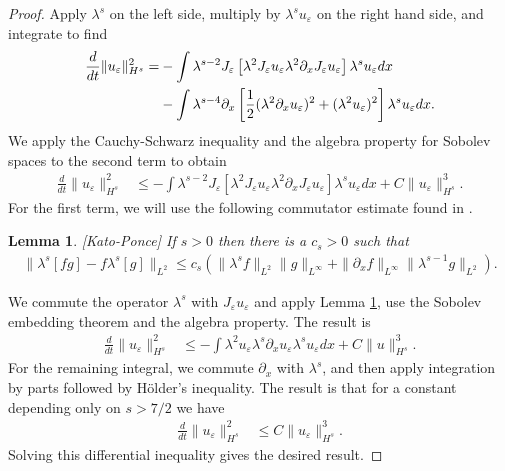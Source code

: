 \documentclass[reqno]{amsart}
\theoremstyle{plain}
\newtheorem{lemma}{Lemma}[section]
\numberwithin{equation}{section}
\newcommand{\ee}{\varepsilon}
\begin{document}
\begin{proof}
    Apply $ \lambda^{s}$ on the left side, multiply by $\lambda^{s} u_\ee$ on the right hand side, and integrate to find 
\begin{align}
   \frac{d}{dt}  \|u_\ee\|^2_{H^s}   
   =  &
  - \int \lambda^{s-2} J_\ee \left [ \lambda^2 J_\ee u_\ee \lambda^2 \partial_x J_\ee u _\ee \right]  \lambda^s u_\ee dx
\notag
\\
  &- \int \lambda^{s-4} \partial_x \left[    \frac12( \lambda^2 \partial_x u_\ee  )^2 +  
(  \lambda^2   u _\ee )^2  \right]  \lambda^s u_\ee dx .
\notag
\end{align}
  We apply the Cauchy-Schwarz inequality and the algebra property for Sobolev spaces to the second term  to obtain 
  \begin{align}
    \frac{d}{dt}  \|u_\ee\|^2_{H^s}   
  & \le
  - \int \lambda^{s-2} J_\ee \left [ \lambda^2 J_\ee u_\ee \lambda^2 \partial_x J_\ee u _\ee \right]  \lambda^s u_\ee dx
  +     C \|u_\ee\|_{H^s}^3. 
\end{align}
For the first term, we will use the following commutator estimate found in \cite{kp}.
\begin{lemma}\label{KP} [Kato-Ponce] If $s>0$ then there is a $c_s>0$ such that 
\begin{align}
\| \lambda^s [fg]- f\lambda^s[g]\|_{L^2} \le c_s \left( \|\lambda^s f\|_{L^2} \|g\|_{L^\infty}+ \|\partial_x f\|_{L^\infty} \|\lambda^{s-1}g\|_{L^2} 
\right). 
\end{align}
\end{lemma}

We commute the operator $\lambda^s$ with $J_\ee u_\ee$ and apply Lemma \ref{KP}, use the Sobolev embedding theorem and the algebra property. The result is  
  \begin{align}
   \frac{d}{dt}  \|u_\ee\|^2_{H^s}   
  & \le
    -  \int  \lambda^2 u_\ee \lambda^s \partial_x  u_\ee    \lambda^s u_\ee dx
  +     C \|u\|_{H^s}^3. 
\end{align}
 For the remaining integral, we commute $\partial_x$ with $\lambda^s$, and then apply integration by parts followed by H\"older's inequality. The result is that for a constant depending only on $s>7/2$ we have 
  \begin{align} 
   \frac{d}{dt}  \|u_\ee\|^2_{H^s}  
  & \le C \|u_\ee\|_{H^s}^3 . 
\end{align}
Solving this differential inequality gives the desired result. 
\end{proof}
\end{document}
